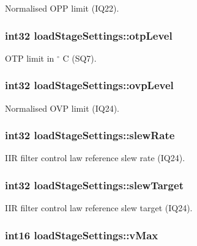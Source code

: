 Normalised O\-P\-P limit (I\-Q22). \hypertarget{a00008_aa6747ff53a28e2d70f455cbd63ff640a}{
\subsubsection[{otp\-Level}]{\setlength{\rightskip}{0pt plus 5cm}int32 load\-Stage\-Settings\-::otp\-Level}}\label{a00008_aa6747ff53a28e2d70f455cbd63ff640a}
O\-T\-P limit in $ ^\circ$ C (S\-Q7). \hypertarget{a00008_a0f9add3cfd5cacd7ee9473c224b49968}{
\subsubsection[{ovp\-Level}]{\setlength{\rightskip}{0pt plus 5cm}int32 load\-Stage\-Settings\-::ovp\-Level}}\label{a00008_a0f9add3cfd5cacd7ee9473c224b49968}
Normalised O\-V\-P limit (I\-Q24). \hypertarget{a00008_a8dae50a66a5a7802c4176406bf67eb26}{
\subsubsection[{slew\-Rate}]{\setlength{\rightskip}{0pt plus 5cm}int32 load\-Stage\-Settings\-::slew\-Rate}}\label{a00008_a8dae50a66a5a7802c4176406bf67eb26}
I\-I\-R filter control law reference slew rate (I\-Q24). \hypertarget{a00008_acc0f896ac1d2a998d480739a13461b19}{
\subsubsection[{slew\-Target}]{\setlength{\rightskip}{0pt plus 5cm}int32 load\-Stage\-Settings\-::slew\-Target}}\label{a00008_acc0f896ac1d2a998d480739a13461b19}
I\-I\-R filter control law reference slew target (I\-Q24). \hypertarget{a00008_a13979ea63b60199c61b1872c03b0a51d}{
\subsubsection[{v\-Max}]{\setlength{\rightskip}{0pt plus 5cm}int16 load\-Stage\-Settings\-::v\-Max}}\label{a00008_a13979ea63b60199c61b1872c03b0a51d}
